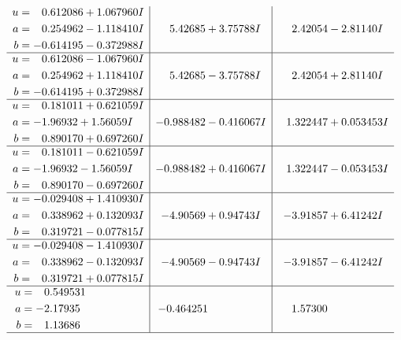 \documentclass[1p]{elsarticle_modified}
\theoremstyle{definition}
\begin{document}
$$\begin{array}{c|c|c}
\begin{aligned}
u &= \phantom{-}0.612086 + 1.067960 I \\
a &= \phantom{-}0.254962 - 1.118410 I \\
b &= -0.614195 - 0.372988 I\end{aligned}
 & \phantom{-}5.42685 + 3.75788 I & \phantom{-}2.42054 - 2.81140 I \\ \hline\begin{aligned}
u &= \phantom{-}0.612086 - 1.067960 I \\
a &= \phantom{-}0.254962 + 1.118410 I \\
b &= -0.614195 + 0.372988 I\end{aligned}
 & \phantom{-}5.42685 - 3.75788 I & \phantom{-}2.42054 + 2.81140 I \\ \hline\begin{aligned}
u &= \phantom{-}0.181011 + 0.621059 I \\
a &= -1.96932 + 1.56059 I \\
b &= \phantom{-}0.890170 + 0.697260 I\end{aligned}
 & -0.988482 - 0.416067 I & \phantom{-}1.322447 + 0.053453 I \\ \hline\begin{aligned}
u &= \phantom{-}0.181011 - 0.621059 I \\
a &= -1.96932 - 1.56059 I \\
b &= \phantom{-}0.890170 - 0.697260 I\end{aligned}
 & -0.988482 + 0.416067 I & \phantom{-}1.322447 - 0.053453 I \\ \hline\begin{aligned}
u &= -0.029408 + 1.410930 I \\
a &= \phantom{-}0.338962 + 0.132093 I \\
b &= \phantom{-}0.319721 - 0.077815 I\end{aligned}
 & -4.90569 + 0.94743 I & -3.91857 + 6.41242 I \\ \hline\begin{aligned}
u &= -0.029408 - 1.410930 I \\
a &= \phantom{-}0.338962 - 0.132093 I \\
b &= \phantom{-}0.319721 + 0.077815 I\end{aligned}
 & -4.90569 - 0.94743 I & -3.91857 - 6.41242 I \\ \hline\begin{aligned}
u &= \phantom{-}0.549531\phantom{ +0.000000I} \\
a &= -2.17935\phantom{ +0.000000I} \\
b &= \phantom{-}1.13686\phantom{ +0.000000I}\end{aligned}
 & -0.464251\phantom{ +0.000000I} & \phantom{-}1.57300\phantom{ +0.000000I}\\
 \hline 
 \end{array}$$\newpage
\end{document}
